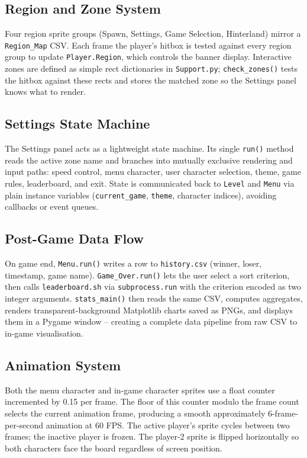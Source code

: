 \documentclass[12pt, a4paper]{article}
\begin{document}
\subsection{Region and Zone System}

Four region sprite groups (Spawn, Settings, Game Selection, Hinterland) mirror a \texttt{Region\_Map} CSV. Each frame the player's hitbox is tested against every region group to update \texttt{Player.Region}, which controls the banner display. Interactive zones are defined as simple rect dictionaries in \texttt{Support.py}; \texttt{check\_zones()} tests the hitbox against these rects and stores the matched zone so the Settings panel knows what to render.

\subsection{Settings State Machine}

The Settings panel acts as a lightweight state machine. Its single \texttt{run()} method reads the active zone name and branches into mutually exclusive rendering and input paths: speed control, menu character, user character selection, theme, game rules, leaderboard, and exit. State is communicated back to \texttt{Level} and \texttt{Menu} via plain instance variables (\texttt{current\_game}, \texttt{theme}, character indices), avoiding callbacks or event queues.

\subsection{Post-Game Data Flow}

On game end, \texttt{Menu.run()} writes a row to \texttt{history.csv} (winner, loser, timestamp, game name). \texttt{Game\_Over.run()} lets the user select a sort criterion, then calls \texttt{leaderboard.sh} via \texttt{subprocess.run} with the criterion encoded as two integer arguments. \texttt{stats\_main()} then reads the same CSV, computes aggregates, renders transparent-background Matplotlib \cite{matplotlib} charts saved as PNGs, and displays them in a Pygame window -- creating a complete data pipeline from raw CSV to in-game visualisation.

\subsection{Animation System}

Both the menu character and in-game character sprites use a float counter incremented by 0.15 per frame. The floor of this counter modulo the frame count selects the current animation frame, producing a smooth approximately 6-frame-per-second animation at 60 FPS. The active player's sprite cycles between two frames; the inactive player is frozen. The player-2 sprite is flipped horizontally so both characters face the board regardless of screen position.
\end{document}
